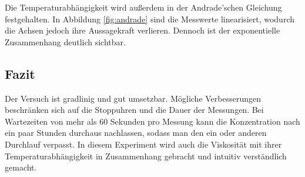 Die Temperaturabhängigkeit wird außerdem in der Andrade'schen Gleichung festgehalten. In Abbildung \ref{fig:andrade} sind die Messwerte linearisiert, wodurch die Achsen jedoch ihre Aussagekraft verlieren.
Dennoch ist der exponentielle Zusammenhang deutlich sichtbar.

\subsection{Fazit}
Der Versuch ist gradlinig und gut umsetzbar. Mögliche Verbesserungen beschränken sich auf die Stoppuhren und die Dauer der Messungen. Bei Wartezeiten von mehr als 60 Sekunden pro Messung
kann die Konzentration nach ein paar Stunden durchaus nachlassen, sodass man den ein oder anderen Durchlauf verpasst.
In diesem Experiment wird auch die Viskosität mit ihrer Temperaturabhängigkeit in Zusammenhang gebracht und intuitiv verständlich gemacht.